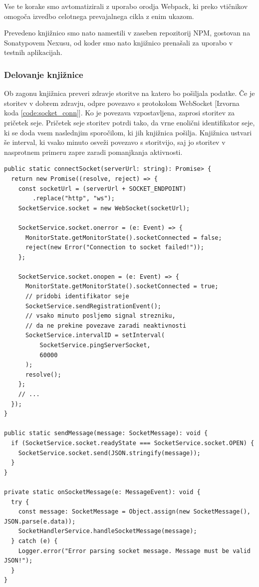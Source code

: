 \documentclass[a4paper, 12pt]{book}
\begin{document}
Vse te korake smo avtomatizirali z uporabo orodja Webpack, ki preko vtičnikov omogoča izvedbo celotnega prevajalnega cikla z enim ukazom. 

Prevedeno knjižnico smo nato namestili v zaseben repozitorij NPM, gostovan na Sonatypovem Nexusu, od koder smo nato knjižnico prenašali za uporabo v testnih aplikacijah.

\subsubsection{Delovanje knjižnice}

Ob zagonu knjižnica preveri zdravje storitve na katero bo pošiljala podatke. Če je storitev v dobrem zdravju, odpre povezavo s protokolom WebSocket [Izvorna koda \ref{code:socket_conn}]. Ko je povezava vzpostavljena, zaprosi storitev za pričetek seje. Pričetek seje storitev potrdi tako, da vrne enolični identifikator seje, ki se doda vsem naslednjim sporočilom, ki jih knjižnica pošilja. Knjižnica ustvari še interval, ki vsako minuto osveži povezavo s storitvijo, saj jo storitev v nasprotnem primeru zapre zaradi pomanjkanja aktivnosti.

\begin{lstlisting}[label=code:socket_conn, caption=Odpiranje WebSocket povezave in metode za upravljanje WebSocket akcij]
public static connectSocket(serverUrl: string): Promise> {
  return new Promise((resolve, reject) => {
    const socketUrl = (serverUrl + SOCKET_ENDPOINT)
        .replace("http", "ws");
    SocketService.socket = new WebSocket(socketUrl);

    SocketService.socket.onerror = (e: Event) => {
      MonitorState.getMonitorState().socketConnected = false;
      reject(new Error("Connection to socket failed!"));
    };

    SocketService.socket.onopen = (e: Event) => {
      MonitorState.getMonitorState().socketConnected = true;
      // pridobi identifikator seje
      SocketService.sendRegistrationEvent();
      // vsako minuto posljemo signal strezniku,
      // da ne prekine povezave zaradi neaktivnosti
      SocketService.intervalID = setInterval(
          SocketService.pingServerSocket,
          60000
      );
      resolve();
    };
    // ... 
  });
}

public static sendMessage(message: SocketMessage): void {
  if (SocketService.socket.readyState === SocketService.socket.OPEN) {
    SocketService.socket.send(JSON.stringify(message));
  }
}

private static onSocketMessage(e: MessageEvent): void {
  try {
    const message: SocketMessage = Object.assign(new SocketMessage(), JSON.parse(e.data));
    SocketHandlerService.handleSocketMessage(message);
  } catch (e) {
    Logger.error("Error parsing socket message. Message must be valid JSON!");
  }
}
\end{lstlisting}
\end{document}
